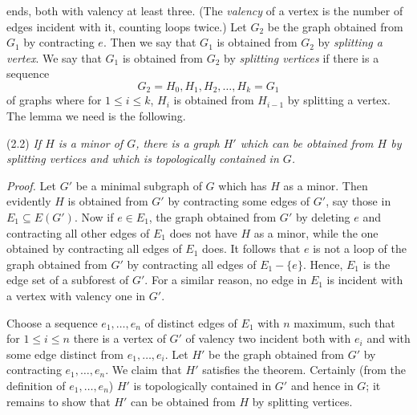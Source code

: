 \noindent ends, both with valency at least three. (The \textit{valency} of a vertex is the number of edges incident with it, counting loops twice.) Let $G_2$ be the graph obtained from $G_1$ by contracting $e$. Then we say that $G_1$ is obtained from $G_2$ by \textit{splitting a vertex}. We say that $G_1$ is obtained from $G_2$ by \textit{splitting vertices} if there is a sequence
\begin{equation*}
G_2 = H_0, H_1, H_2, \dots, H_k = G_1
\end{equation*}
of graphs where for $1 \le i \le k$, $H_i$ is obtained from $H_{i-1}$ by splitting a vertex. The lemma we need is the following.

\stmt
(2.2) \textit{If $H$ is a minor of $G$, there is a graph $H'$ which can be obtained from $H$ by splitting vertices and which is topologically contained in $G$.}

\textit{Proof.} Let $G'$ be a minimal subgraph of $G$ which has $H$ as a minor. Then evidently $H$ is obtained from $G'$ by contracting some edges of $G'$, say those in $E_1 \subseteq E(G')$. Now if $e \in E_1$, the graph obtained from $G'$ by deleting $e$ and contracting all other edges of $E_1$ does not have $H$ as a minor, while the one obtained by contracting all edges of $E_1$ does. It follows that $e$ is not a loop of the graph obtained from $G'$ by contracting all edges of $E_1 - \{e\}$. Hence, $E_1$ is the edge set of a subforest of $G'$. For a similar reason, no edge in $E_1$ is incident with a vertex with valency one in $G'$.

Choose a sequence $e_1, \dots, e_n$ of distinct edges of $E_1$ with $n$ maximum, such that for $1 \le i \le n$ there is a vertex of $G'$ of valency two incident both with $e_i$ and with some edge distinct from $e_1, \dots, e_i$. Let $H'$ be the graph obtained from $G'$ by contracting $e_1, \dots, e_n$. We claim that $H'$ satisfies the theorem. Certainly (from the definition of $e_1, \dots, e_n$) $H'$ is topologically contained in $G'$ and hence in $G$; it remains to show that $H'$ can be obtained from $H$ by splitting vertices.

